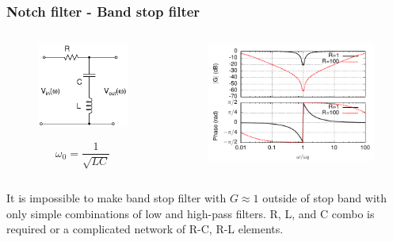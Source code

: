 \documentclass[beamer]{standalone}
\begin{document}
\frame
{ \frametitle{Notch filter - Band stop filter}
\vskip -0.4in
\begin{columns}
 \begin{column}{.250\textwidth}
  \begin{figure}
   \includegraphics[angle=0,width=1.00\textwidth]{./circuits/rlcnotch.pdf}
  \end{figure}
  \[
  \omega_0=\frac{1}{\sqrt{LC}}
  \]
 \end{column}
 \begin{column}{.750\textwidth}
  \begin{figure}
   \includegraphics[angle=0,width=1.0\textwidth]{./plots/rlc_notch_bode.pdf}
  \end{figure}
 \end{column}
\end{columns}
\alert{It is impossible to make band stop filter with $G\approx1$ outside
of stop band with only simple combinations of low and high-pass filters.}
R, L, and C combo is required or a complicated network of R-C, R-L elements.
}
\end{document}
